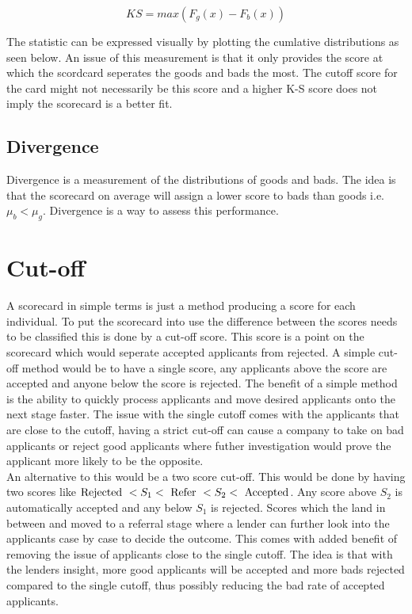 \begin{equation}\label{KS}
KS = max(F_{g}(x) - F_{b}(x))
\end{equation}

The statistic can be expressed visually by plotting the cumlative distributions as seen below. An issue of this measurement is that it only provides the score at which the scordcard seperates the goods and bads the most. The cutoff score for the card might not necessarily be this score and a higher K-S score does not imply the scorecard is a better fit. 

\subsection{Divergence}

Divergence is a measurement of the distributions of goods and bads. The idea is that the scorecard on average will assign a lower score to bads than goods i.e. $\mu_{b} < \mu_{g}$. Divergence is a way to assess this performance. 

\section{Cut-off}
A scorecard in simple terms is just a method producing a score for each individual. To put the scorecard into use the difference between the scores needs to be classified this is done by a cut-off score. This score is a point on the scorecard which would seperate accepted applicants from rejected. A simple cut-off method would be to have a single score, any applicants above the score are accepted and anyone below the score is rejected. The benefit of a simple method is the ability to quickly process applicants and move desired applicants onto the next stage faster. The issue with the single cutoff comes with the applicants that are close to the cutoff, having a strict cut-off can cause a company to take on bad applicants or reject good applicants where futher investigation would prove the applicant more likely to be the opposite. \\

An alternative to this would be a two score cut-off. This would be done by having two scores like $ \textup{Rejected } < S_{1} < \textup{ Refer } < S_{2} < \textup{ Accepted}$. Any score above $S_{2}$ is automatically accepted and any below $S_{1}$ is rejected. Scores which the land in between and moved to a referral stage where a lender can further look into the applicants case by case to decide the outcome. This comes with added benefit of removing the issue of applicants close to the single cutoff. The idea is that with the lenders insight, more good applicants will be accepted and more bads rejected compared to the single cutoff, thus possibly reducing the bad rate of accepted applicants. \\

